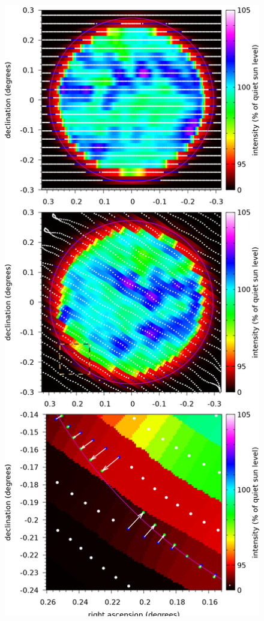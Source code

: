 \documentclass{aa}
\begin{document}
  \begin{figure}
  \centering
  \includegraphics[width=\columnwidth]{nea_box.png}

\end{figure}
\end{document}
